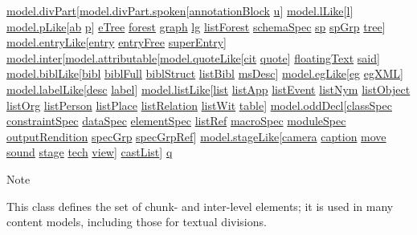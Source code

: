 \begin{reflist}
  \hyperref[TEI.model.divPart]{model.divPart}[\hyperref[TEI.model.divPart.spoken]{model.divPart.spoken}[\hyperref[TEI.annotationBlock]{annotationBlock} \hyperref[TEI.u]{u}] \hyperref[TEI.model.lLike]{model.lLike}[\hyperref[TEI.l]{l}] \hyperref[TEI.model.pLike]{model.pLike}[\hyperref[TEI.ab]{ab} \hyperref[TEI.p]{p}] \hyperref[TEI.eTree]{eTree} \hyperref[TEI.forest]{forest} \hyperref[TEI.graph]{graph} \hyperref[TEI.lg]{lg} \hyperref[TEI.listForest]{listForest} \hyperref[TEI.schemaSpec]{schemaSpec} \hyperref[TEI.sp]{sp} \hyperref[TEI.spGrp]{spGrp} \hyperref[TEI.tree]{tree}] \hyperref[TEI.model.entryLike]{model.entryLike}[\hyperref[TEI.entry]{entry} \hyperref[TEI.entryFree]{entryFree} \hyperref[TEI.superEntry]{superEntry}] \hyperref[TEI.model.inter]{model.inter}[\hyperref[TEI.model.attributable]{model.attributable}[\hyperref[TEI.model.quoteLike]{model.quoteLike}[\hyperref[TEI.cit]{cit} \hyperref[TEI.quote]{quote}] \hyperref[TEI.floatingText]{floatingText} \hyperref[TEI.said]{said}] \hyperref[TEI.model.biblLike]{model.biblLike}[\hyperref[TEI.bibl]{bibl} \hyperref[TEI.biblFull]{biblFull} \hyperref[TEI.biblStruct]{biblStruct} \hyperref[TEI.listBibl]{listBibl} \hyperref[TEI.msDesc]{msDesc}] \hyperref[TEI.model.egLike]{model.egLike}[\hyperref[TEI.eg]{eg} \hyperref[TEI.egXML]{egXML}] \hyperref[TEI.model.labelLike]{model.labelLike}[\hyperref[TEI.desc]{desc} \hyperref[TEI.label]{label}] \hyperref[TEI.model.listLike]{model.listLike}[\hyperref[TEI.list]{list} \hyperref[TEI.listApp]{listApp} \hyperref[TEI.listEvent]{listEvent} \hyperref[TEI.listNym]{listNym} \hyperref[TEI.listObject]{listObject} \hyperref[TEI.listOrg]{listOrg} \hyperref[TEI.listPerson]{listPerson} \hyperref[TEI.listPlace]{listPlace} \hyperref[TEI.listRelation]{listRelation} \hyperref[TEI.listWit]{listWit} \hyperref[TEI.table]{table}] \hyperref[TEI.model.oddDecl]{model.oddDecl}[\hyperref[TEI.classSpec]{classSpec} \hyperref[TEI.constraintSpec]{constraintSpec} \hyperref[TEI.dataSpec]{dataSpec} \hyperref[TEI.elementSpec]{elementSpec} \hyperref[TEI.listRef]{listRef} \hyperref[TEI.macroSpec]{macroSpec} \hyperref[TEI.moduleSpec]{moduleSpec} \hyperref[TEI.outputRendition]{outputRendition} \hyperref[TEI.specGrp]{specGrp} \hyperref[TEI.specGrpRef]{specGrpRef}] \hyperref[TEI.model.stageLike]{model.stageLike}[\hyperref[TEI.camera]{camera} \hyperref[TEI.caption]{caption} \hyperref[TEI.move]{move} \hyperref[TEI.sound]{sound} \hyperref[TEI.stage]{stage} \hyperref[TEI.tech]{tech} \hyperref[TEI.view]{view}] \hyperref[TEI.castList]{castList}] \hyperref[TEI.q]{q}
    \item[{Note}]
  \par
This class defines the set of chunk- and inter-level elements; it is used in many content models, including those for textual divisions.
\end{reflist}  
